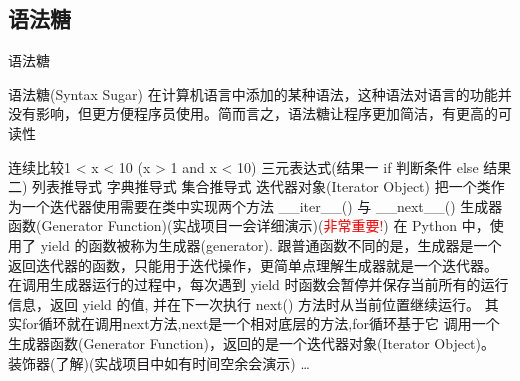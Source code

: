 \subsection{语法糖}
\begin{frame}[standout] 语法糖 \end{frame}
\begin{frame}{语法糖(Syntax Sugar)}
    \tiny{在计算机语言中添加的某种语法，这种语法对语言的功能并没有影响，但更方便程序员使用。简而言之，语法糖让程序更加简洁，有更高的可读性}
    \begin{myoutline}
        \1 连续比较1 < x < 10 (x > 1 and x < 10)
        \1 三元表达式(结果一 if 判断条件 else 结果二)
        \1 列表推导式
        \1 字典推导式
        \1 集合推导式
        \1 迭代器对象(Iterator Object)
            \2 把一个类作为一个迭代器使用需要在类中实现两个方法 \_\_iter\_\_() 与 \_\_next\_\_() 
        \1 生成器函数(Generator Function)(实战项目一会详细演示)(\textcolor{red}{非常重要!})
            \2 在 Python 中，使用了 yield 的函数被称为生成器(generator).
            \2 跟普通函数不同的是，生成器是一个返回迭代器的函数，只能用于迭代操作，更简单点理解生成器就是一个迭代器。
            \2 在调用生成器运行的过程中，每次遇到 yield 时函数会暂停并保存当前所有的运行信息，返回 yield 的值, 并在下一次执行 next() 方法时从当前位置继续运行。
            \2 其实for循环就在调用next方法,next是一个相对底层的方法,for循环基于它
            \2 调用一个生成器函数(Generator Function)，返回的是一个迭代器对象(Iterator Object)。
        \1 装饰器(了解)(实战项目中如有时间空余会演示)
        \1 \dots
    \end{myoutline}
\end{frame}
